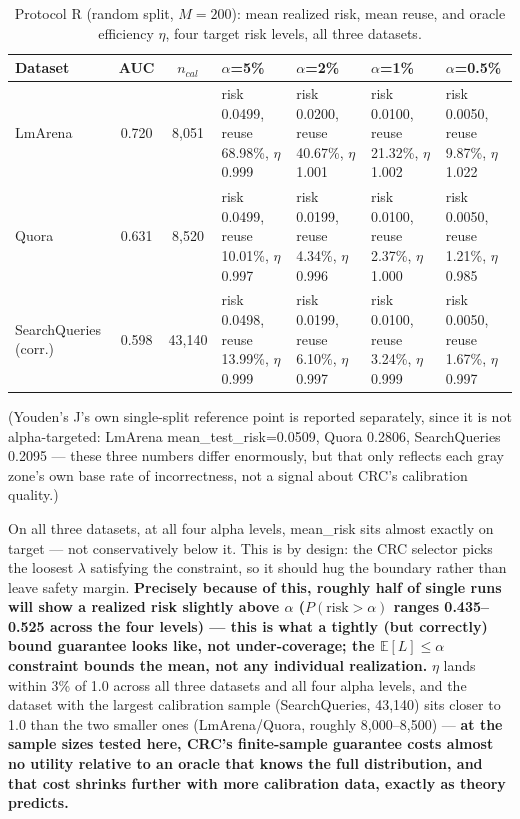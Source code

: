 \documentclass[11pt]{article}
\newenvironment{fittab}{\begin{lrbox}{\fittabbox}}{\end{lrbox}%
  \ifdim\wd\fittabbox>\linewidth\resizebox{\linewidth}{!}{\usebox{\fittabbox}}\else\usebox{\fittabbox}\fi}
\begin{document}
\begin{table}[h]
\centering
\footnotesize
\begin{fittab}\begin{tabular}{@{}lccp{2.2cm}p{2.2cm}p{2.2cm}p{2.2cm}@{}}
\toprule
\textbf{Dataset} & \textbf{AUC} & \textbf{$n_{cal}$} & $\alpha$=5\% & $\alpha$=2\% & $\alpha$=1\% & $\alpha$=0.5\% \\
\midrule
LmArena & 0.720 & 8{,}051 & risk 0.0499, reuse 68.98\%, $\eta$ 0.999 & risk 0.0200, reuse 40.67\%, $\eta$ 1.001 & risk 0.0100, reuse 21.32\%, $\eta$ 1.002 & risk 0.0050, reuse 9.87\%, $\eta$ 1.022 \\
Quora & 0.631 & 8{,}520 & risk 0.0499, reuse 10.01\%, $\eta$ 0.997 & risk 0.0199, reuse 4.34\%, $\eta$ 0.996 & risk 0.0100, reuse 2.37\%, $\eta$ 1.000 & risk 0.0050, reuse 1.21\%, $\eta$ 0.985 \\
SearchQueries (corr.) & 0.598 & 43{,}140 & risk 0.0498, reuse 13.99\%, $\eta$ 0.999 & risk 0.0199, reuse 6.10\%, $\eta$ 0.997 & risk 0.0100, reuse 3.24\%, $\eta$ 0.999 & risk 0.0050, reuse 1.67\%, $\eta$ 0.997 \\
\bottomrule
\end{tabular}\end{fittab}
\caption{Protocol R (random split, $M=200$): mean realized risk, mean reuse, and oracle efficiency $\eta$, four target risk levels, all three datasets.}
\end{table}

(Youden's J's own single-split reference point is reported separately, since it is not alpha-targeted: LmArena mean\_test\_risk=0.0509, Quora 0.2806, SearchQueries 0.2095 --- these three numbers differ enormously, but that only reflects each gray zone's own base rate of incorrectness, not a signal about CRC's calibration quality.)

On all three datasets, at all four alpha levels, mean\_risk sits almost exactly on target --- not conservatively below it. This is by design: the CRC selector picks the loosest $\lambda$ satisfying the constraint, so it should hug the boundary rather than leave safety margin. \textbf{Precisely because of this, roughly half of single runs will show a realized risk slightly above $\alpha$ ($P(\text{risk}>\alpha)$ ranges 0.435--0.525 across the four levels) --- this is what a tightly (but correctly) bound guarantee looks like, not under-coverage; the $\mathbb{E}[L] \le \alpha$ constraint bounds the mean, not any individual realization.} $\eta$ lands within 3\% of 1.0 across all three datasets and all four alpha levels, and the dataset with the largest calibration sample (SearchQueries, 43{,}140) sits closer to 1.0 than the two smaller ones (LmArena/Quora, roughly 8{,}000--8{,}500) --- \textbf{at the sample sizes tested here, CRC's finite-sample guarantee costs almost no utility relative to an oracle that knows the full distribution, and that cost shrinks further with more calibration data, exactly as theory predicts.}
\end{document}
